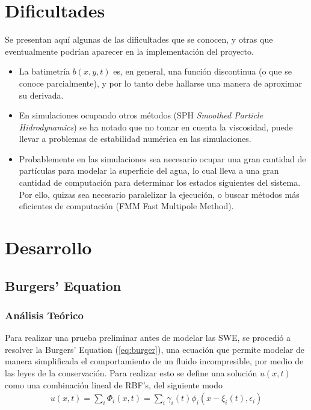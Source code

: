 \documentclass[spanish, fleqn]{article}
\begin{document}
\section{Dificultades}
Se presentan aquí algunas de las dificultades que se conocen, y otras que eventualmente podrían aparecer en la implementación 
del proyecto.
\begin{itemize}
	\item La batimetría $b(x,y,t)$ es, en general, una función discontinua (o que se conoce parcialmente), y por lo tanto 
	debe hallarse una manera de aproximar su derivada.
	\item En simulaciones ocupando otros métodos (SPH \textit{Smoothed Particle Hidrodynamics}) se ha notado que no tomar 
	en cuenta la viscosidad, puede llevar a problemas de estabilidad numérica en las simulaciones.
	\item Probablemente en las simulaciones sea necesario ocupar una gran cantidad de partículas para modelar la superficie
	del agua, lo cual lleva a una gran cantidad de computación para determinar los estados siguientes del sistema. Por ello,
	quizas sea necesario paralelizar la ejecución, o buscar métodos más eficientes de computación (FMM Fast Multipole 
	Method).
\end{itemize}                                                                                                                                                                                                                                                                                                                                                                                                     
\newpage  
\section{Desarrollo}
  \subsection{Burgers' Equation}
  \subsubsection{Análisis Teórico}
    Para realizar una prueba preliminar antes de modelar las SWE, se procedió a resolver la Burgers' Equation (\ref{eq:burger}), una ecuación que permite modelar de manera simplificada el comportamiento de un fluido incompresible, por medio de las leyes de la conservación. Para realizar esto se define una solución $u(x,t)$ como una combinación lineal de RBF's, del siguiente modo
    \begin{align}
      u(x,t) = \sum_{i} \Phi_i(x,t) = \sum_i \gamma_i(t)\phi_i(x-\xi_i(t),\epsilon_i)
    \end{align}
    
\end{document}
